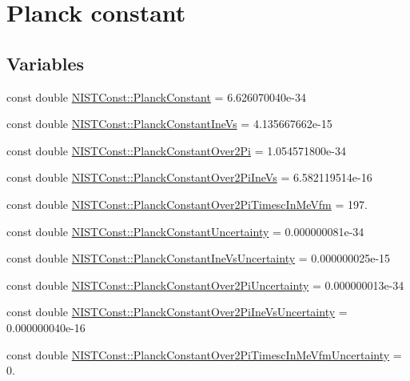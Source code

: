 \hypertarget{group___planck_constant}{}\section{Planck constant}
\label{group___planck_constant}
\subsection*{Variables}
\begin{DoxyCompactItemize}
\item 
const double \hyperlink{group___planck_constant_ga6caa482b17de2f08f423eff1a521b0d7}{N\+I\+S\+T\+Const\+::\+Planck\+Constant} = 6.\+626070040e-\/34
\item 
const double \hyperlink{group___planck_constant_ga4587d736f45c35788453a9509eaee7f2}{N\+I\+S\+T\+Const\+::\+Planck\+Constant\+Ine\+Vs} = 4.\+135667662e-\/15
\item 
const double \hyperlink{group___planck_constant_ga9b3484c3c80e4a97206c7945b0db539b}{N\+I\+S\+T\+Const\+::\+Planck\+Constant\+Over2\+Pi} = 1.\+054571800e-\/34
\item 
const double \hyperlink{group___planck_constant_ga1d45cff7c25d4ebb0639311d5c3ea20d}{N\+I\+S\+T\+Const\+::\+Planck\+Constant\+Over2\+Pi\+Ine\+Vs} = 6.\+582119514e-\/16
\item 
const double \hyperlink{group___planck_constant_ga76ea84456bc32be18fa15034da108214}{N\+I\+S\+T\+Const\+::\+Planck\+Constant\+Over2\+Pi\+Timesc\+In\+Me\+Vfm} = 197.
\item 
const double \hyperlink{group___planck_constant_gaf490152b8477c6ead134e42e76753f64}{N\+I\+S\+T\+Const\+::\+Planck\+Constant\+Uncertainty} = 0.\+000000081e-\/34
\item 
const double \hyperlink{group___planck_constant_ga566abddd238d05d995f61aa5d8663b3c}{N\+I\+S\+T\+Const\+::\+Planck\+Constant\+Ine\+Vs\+Uncertainty} = 0.\+000000025e-\/15
\item 
const double \hyperlink{group___planck_constant_ga9a87455000578edf387376117fd5bfd8}{N\+I\+S\+T\+Const\+::\+Planck\+Constant\+Over2\+Pi\+Uncertainty} = 0.\+000000013e-\/34
\item 
const double \hyperlink{group___planck_constant_ga4b2be019a874ac4dab4031b849242335}{N\+I\+S\+T\+Const\+::\+Planck\+Constant\+Over2\+Pi\+Ine\+Vs\+Uncertainty} = 0.\+000000040e-\/16
\item 
const double \hyperlink{group___planck_constant_gae5db39f3f8b53c75ed26b3b83b74bb42}{N\+I\+S\+T\+Const\+::\+Planck\+Constant\+Over2\+Pi\+Timesc\+In\+Me\+Vfm\+Uncertainty} = 0.
\end{DoxyCompactItemize}


